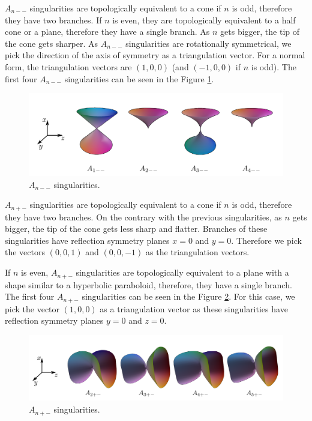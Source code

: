 $A_{n--}$ singularities are topologically equivalent to a cone if $n$ is odd, therefore
they have two branches.
If $n$ is even, they are topologically equivalent to a half cone or a plane, therefore
they have a single branch.
As $n$ gets bigger, the tip of the cone gets sharper. As $A_{n--}$ singularities
are rotationally symmetrical, we pick the direction of
the axis of symmetry as a triangulation vector. For a normal form, the triangulation vectors
are $(1, 0, 0)$ (and $(-1, 0, 0)$ if $n$ is odd).
The first four $A_{n--}$ singularities can be seen in the Figure \ref{img:4}.

\begin{figure}
    \centerline{\includegraphics[scale=0.5]{images/img4}}
    \caption[$A_{n--}$ singularities]
    {$A_{n--}$ singularities. \cite{morris2003client}}
    \label{img:4}
\end{figure}


$A_{n+-}$ singularities are topologically equivalent to a cone if $n$ is odd, therefore
they have two branches.
On the contrary with the previous singularities, as $n$ gets bigger, the tip
of the cone gets less sharp and flatter. Branches of these singularities have 
reflection symmetry planes $x=0$ and $y=0$. Therefore we pick the vectors
$(0, 0, 1)$ and $(0, 0, -1)$ as the triangulation vectors.

If $n$ is even, $A_{n+-}$ singularities are topologically equivalent to a plane
with a shape similar to a hyperbolic paraboloid, therefore, they have a single branch.
The first four $A_{n+-}$ singularities can be seen in the Figure \ref{img:5}.
For this case, we pick the vector $(1, 0, 0)$ as a triangulation vector as
these singularities have reflection symmetry planes $y=0$ and $z=0$.

\begin{figure}
    \centerline{\includegraphics[scale=0.5]{images/img5}}
    \caption[$A_{n+-}$ singularities]
    {$A_{n+-}$ singularities. \cite{morris2003client}}
    \label{img:5}
\end{figure}

